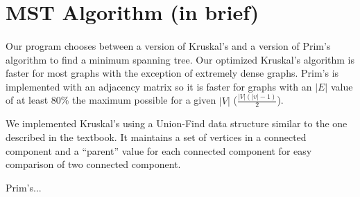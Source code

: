 \section{MST Algorithm (in brief)}
\label{sec:algbrief}

\paragraph{}
Our program chooses between a version of Kruskal's and a version of Prim's
algorithm to find a minimum spanning tree. Our optimized Kruskal's
algorithm is faster for most graphs with the exception of extremely dense
graphs. Prim's is implemented with an adjacency matrix so it is faster for
graphs with an $|E|$ value of at least 80\% the maximum possible for a
given $|V|$ ($\frac{|V|(|v| - 1)}{2}$).

We implemented Kruskal's using a Union-Find data structure similar to the
one described in the textbook. It maintains a set of vertices in a
connected component and a ``parent'' value for each connected component
for easy comparison of two connected component.

Prim's...
